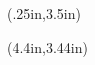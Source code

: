 \begin{textblock*}{\textwidth}(.25in,3.5in)
\end{textblock*} 
\begin{textblock*}{\textwidth}(4.4in,3.44in)
\end{textblock*} 